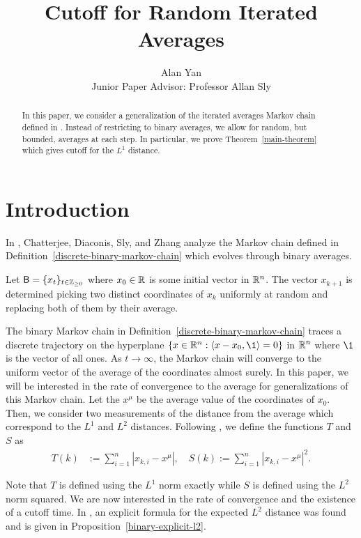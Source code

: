 \documentclass[12pt]{article}
\title{Cutoff for Random Iterated Averages}
\author{Alan Yan \\ Junior Paper Advisor: Professor Allan Sly}
\begin{document}
\maketitle

\begin{abstract}
	In this paper, we consider a generalization of the iterated averages Markov chain defined in \cite{chatterjee2021phase}. Instead of restricting to binary averages, we allow for random, but bounded, averages at each step. In particular, we prove Theorem~\ref{main-theorem} which gives cutoff for the $L^1$ distance.  
\end{abstract}
\tableofcontents

\newpage 

\section{Introduction}

In \cite{chatterjee2021phase}, Chatterjee, Diaconis, Sly, and Zhang analyze the Markov chain defined in Definition~\ref{discrete-binary-markov-chain} which evolves through binary averages.  
\begin{defn} \label{discrete-binary-markov-chain}
	Let $\mathsf{B} = \{x_t\}_{t \in \mathbb{Z}_{\geq 0}}$ where $x_0 \in \mathbb{R}$ is some initial vector in $\mathbb{R}^n$. The vector $x_{k+1}$ is determined picking two distinct coordinates of $x_k$ uniformly at random and replacing both of them by their average. 
\end{defn}

The binary Markov chain in Definition~\ref{discrete-binary-markov-chain} traces a discrete trajectory on the hyperplane $\{x \in \RR^n : \langle x - x_0, \1 \rangle = 0\}$ in $\mathbb{R}^n$ where $\1$ is the vector of all ones. As $t \to \infty$, the Markov chain will converge to the uniform vector of the average of the coordinates almost surely. In this paper, we will be interested in the rate of convergence to the average for generalizations of this Markov chain. Let the $x^\mu$ be the average value of the coordinates of $x_0$. Then, we consider two measurements of the distance from the average which correspond to the $L^1$ and $L^2$ distances. Following \cite{chatterjee2021phase}, we define the functions $T$ and $S$ as 
\begin{align*}
	T(k) & := \sum_{i = 1}^n |x_{k, i} - x^\mu|, \quad S(k) := \sum_{i = 1}^n |x_{k, i} - x^\mu|^2.
\end{align*}

Note that $T$ is defined using the $L^1$ norm exactly while $S$ is defined using the $L^2$ norm squared. We are now interested in the rate of convergence and the existence of a cutoff time. In \cite{chatterjee2021phase}, an explicit formula for the expected $L^2$ distance was found and is given in Proposition~\ref{binary-explicit-l2}.
\end{document}
